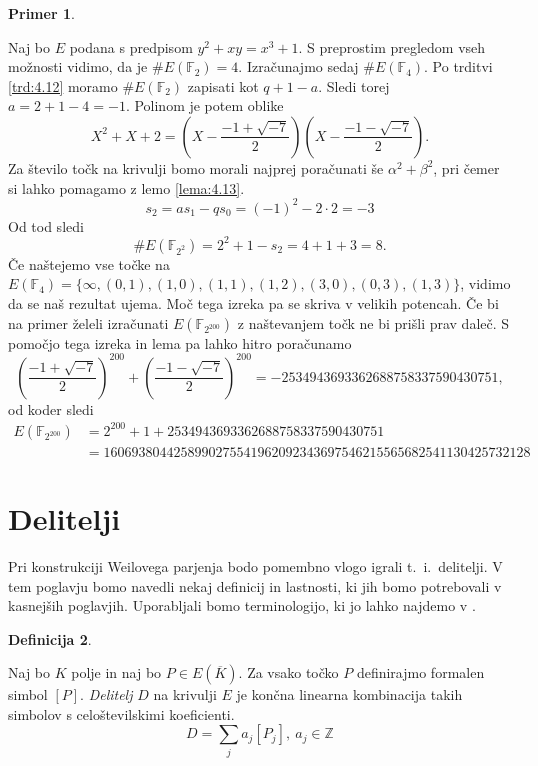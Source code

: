 \documentclass[12pt,a4paper,twoside]{article}
\theoremstyle{definition} %
\newtheorem{definicija}{Definicija}[section]
\newtheorem{primer}[definicija]{Primer}
\theoremstyle{plain} %
\numberwithin{equation}{section}  %
\newcommand{\Z}{\mathbb Z}
\newcommand{\F}{\mathbb F}
\newcommand{\E}[1]{E({#1})}
\begin{document}
\begin{primer}~

Naj bo $E$ podana s predpisom $y^2+xy = x^3+1$. S preprostim pregledom vseh možnosti vidimo, da je $\#\E{\F_2} = 4$. Izračunajmo sedaj $\#\E{\F_4}$. Po trditvi \ref{trd:4.12} moramo
$\#\E{\F_2}$ zapisati kot $q+1-a$. Sledi torej $a = 2+1-4 = -1$. Polinom je potem oblike
$$X^2+X+2 = (X-\frac{-1+\sqrt{-7}}{2}) (X-\frac{-1-\sqrt{-7}}{2}).$$
Za število točk na krivulji bomo morali najprej poračunati še $\alpha^2+\beta^2$, pri čemer si lahko pomagamo z lemo \ref{lema:4.13}.
$$s_2 = as_1-qs_0 = (-1)^2-2\cdot2 = -3$$
Od tod sledi
$$\#\E{\F_{2^2}} = 2^2+1-s_2 = 4+1+3 = 8.$$
 Če naštejemo vse točke na $\E{\F_{4}} = \{ \infty,(0,1),(1,0),(1,1),(1,2),(3,0),(0,3),(1,3)\}$, vidimo da se naš rezultat ujema.
Moč tega izreka pa se skriva v velikih potencah. Če bi na primer želeli izračunati
$\E{\F_{2^{200}}}$ z naštevanjem točk ne bi prišli prav daleč. S pomočjo tega izreka in lema pa lahko hitro poračunamo
$$(\frac{-1+\sqrt{-7}}{2})^{200}+ (\frac{-1-\sqrt{-7}}{2})^{200} = -2534943693362688758337590430751,$$
od koder sledi
\begin{align}
\E{\F_{2^{200}}} &{}= 2^{200} + 1 +2534943693362688758337590430751 \nonumber \\
&{}= 1606938044258990275541962092343697546215565682541130425732128 \nonumber
\end{align}
\end{primer}

\newpage


\section{Delitelji}

Pri konstrukciji Weilovega parjenja bodo pomembno vlogo igrali t.\ i.\ delitelji. V tem poglavju bomo navedli nekaj definicij in lastnosti, ki jih bomo potrebovali v kasnejših poglavjih. Uporabljali bomo terminologijo, ki jo lahko najdemo v \cite{Washington2008}.

\begin{definicija}~

Naj bo $K$ polje in naj bo $P \in \E{\overline{K}}$. Za vsako točko $P$ definirajmo formalen simbol $[P]$. \emph{Delitelj} $D$ na krivulji $E$ je končna linearna kombinacija takih simbolov s celoštevilskimi koeficienti.
$$D = \sum_{j}a_j[P_j], \ a_j \in \Z $$

\end{definicija}
\end{document}

